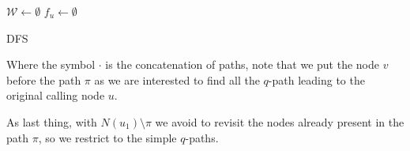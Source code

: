     \begin{algorithm}[h]
		\small
		\DontPrintSemicolon
		\BlankLine
		$\mathcal{W} \gets \emptyset$\;
		$f_{u} \gets \emptyset$ \quad \;    
		\BlankLine
		\BlankLine
		\caption{\textsc{DFS}}
		\label{alg:brute-force}
	\end{algorithm}

	Where the symbol $\cdot$ is the concatenation of paths, note that we put the node $v$ before the path $\pi$ as we are interested to find all the $q$-path leading to the original calling node $u$.
	
	As last thing, with $N(u_{1}) \setminus \pi$ we avoid to revisit the nodes already present in the path $\pi$, so we restrict to the simple $q$-paths.\\
	
